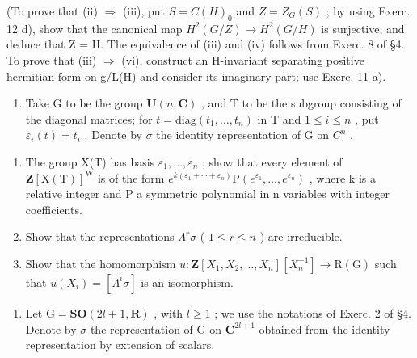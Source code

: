 \begin{enumerate}
(To prove that (ii) \(\Longrightarrow\) (iii), put \(S = C(H)_{0}\) and \(Z = Z_{G}(S)\) ; by using Exerc. 12 d), show that the canonical map \(H^{2}(G/Z) \to H^{2}(G/H)\) is surjective, and deduce that Z = H. The equivalence of (iii) and (iv) follows from Exerc. 8 of §4. To prove that (iii) \(\Longrightarrow\) (vi), construct an H-invariant separating positive hermitian form on g/L(H) and consider its imaginary part; use Exerc. 11 a).


\begin{enumerate}
\def\labelenumi{\arabic{enumi})}
\tightlist
\item
  Take G to be the group \(\mathbf{U}(n,\mathbf{C})\) , and T to be the subgroup consisting of the diagonal matrices; for \(t = \text{diag}(t_1, \ldots, t_n)\) in T and \(1 \leq i \leq n\) , put \(\varepsilon_i(t) = t_i\) . Denote by \(\sigma\) the identity representation of G on \(C^n\) .
\end{enumerate}

\begin{enumerate}
\def\labelenumi{\alph{enumi})}
\item
  The group X(T) has basis \(\varepsilon_{1},\ldots,\varepsilon_{n}\) ; show that every element of \(\mathbf{Z}[\mathrm{X}(\mathrm{T})]^{\mathrm{W}}\) is of the form \(e^{k(\varepsilon_{1}+\cdots+\varepsilon_{n})}\mathrm{P}(e^{\varepsilon_{1}},\ldots,e^{\varepsilon_{n}})\) , where k is a relative integer and P a symmetric polynomial in n variables with integer coefficients.
\item
  Show that the representations \(\Lambda^r\sigma\) ( \(1 \leq r \leq n\) ) are irreducible.
\item
  Show that the homomorphism \(u: \mathbf{Z}[X_1, X_2, \ldots, X_n][X_n^{-1}] \to \mathrm{R}(\mathrm{G})\) such that \(u(X_i) = [\Lambda^i \sigma]\) is an isomorphism.
\end{enumerate}

\begin{enumerate}
\def\labelenumi{\arabic{enumi})}
\setcounter{enumi}{1}
\tightlist
\item
  Let \(\mathrm{G} = \mathbf{SO}(2l + 1, \mathbf{R})\) , with \(l \geq 1\) ; we use the notations of Exerc. 2 of §4. Denote by \(\sigma\) the representation of \(\mathrm{G}\) on \(\mathbf{C}^{2l + 1}\) obtained from the identity representation by extension of scalars.
\end{enumerate}


\end{enumerate}
